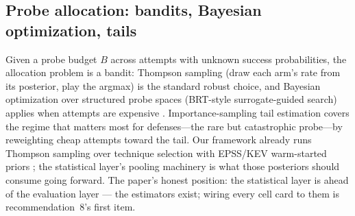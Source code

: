 \subsection{Probe allocation: bandits, Bayesian optimization, tails}\label{sec:allocation}

Given a probe budget $B$ across attempts with unknown success probabilities, the
allocation problem is a bandit: Thompson sampling (draw each arm's rate from its
posterior, play the argmax) is the standard robust choice, and Bayesian
optimization over structured probe spaces (BRT-style surrogate-guided search)
applies when attempts are expensive \cite{sivakumar-anderson}. Importance-sampling
tail estimation covers the regime that matters most for defenses---the rare
but catastrophic probe---by reweighting cheap attempts toward the tail.
Our framework already runs Thompson sampling over technique selection with
EPSS/KEV warm-started priors \cite{epss-first}; the statistical layer's pooling
machinery is what those posteriors should consume going forward. The paper's
honest position: the statistical layer is ahead of the evaluation layer ---
the estimators exist; wiring every cell card to them is recommendation~8's
first item.

